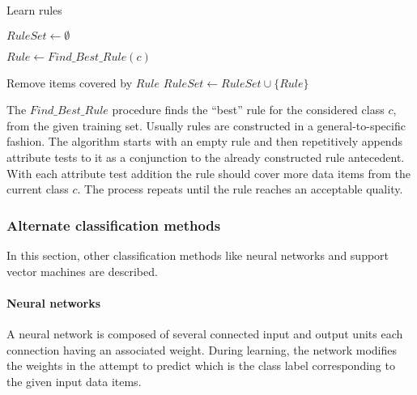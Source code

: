 \begin{algorithm}
\caption{Learn rules}
\label{alg:rulebased}
\begin{algorithmic}[1]
\STATE $RuleSet \leftarrow \emptyset$
	\REPEAT
		\item $Rule \leftarrow Find\_Best\_Rule(c)$
		\item Remove items covered by $Rule$
	\STATE $RuleSet \leftarrow RuleSet \cup \{Rule\} $
\ENDFOR
\end{algorithmic}
\end{algorithm}

The $Find\_Best\_Rule$ procedure finds the ``best'' rule for the considered class $c$, from the given training set. Usually rules are constructed in a general-to-specific fashion. The algorithm starts with an empty rule and then repetitively appends attribute tests to it as a conjunction to the already constructed rule antecedent. With each attribute test addition the rule should cover more data items from the current class $c$. The process repeats until the rule reaches an acceptable quality.

\subsubsection{Alternate classification methods}

In this section, other classification methods like neural networks and support vector machines are described. 

\paragraph{Neural networks}

A neural network is composed of several connected input and output units each connection having an associated  weight. During learning, the network modifies the weights in the attempt to predict which is the class label corresponding to the given input data items. 

